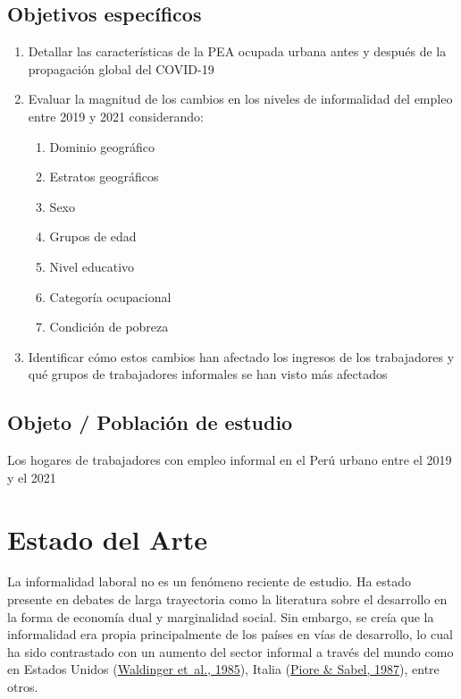 \documentclass[
  letterpaper,
  12pt,
  oneside,
  spanish,
  doublespacing,
  headsepline,
  parskip]{MastersDoctoralThesis}
\begin{document}
\hypertarget{objetivos-especuxedficos}{%
\section{Objetivos específicos}\label{objetivos-especuxedficos}}

\begin{enumerate}
\def\labelenumi{\arabic{enumi}.}
\item
  Detallar las características de la PEA ocupada urbana antes y después
  de la propagación global del COVID-19
\item
  Evaluar la magnitud de los cambios en los niveles de informalidad del
  empleo entre 2019 y 2021 considerando:

  \begin{enumerate}
  \def\labelenumii{\roman{enumii}.}
  \item
    Dominio geográfico
  \item
    Estratos geográficos
  \item
    Sexo
  \item
    Grupos de edad
  \item
    Nivel educativo
  \item
    Categoría ocupacional
  \item
    Condición de pobreza
  \end{enumerate}
\item
  Identificar cómo estos cambios han afectado los ingresos de los
  trabajadores y qué grupos de trabajadores informales se han visto más
  afectados
\end{enumerate}

\hypertarget{objeto-poblaciuxf3n-de-estudio}{%
\section{Objeto / Población de
estudio}\label{objeto-poblaciuxf3n-de-estudio}}

Los hogares de trabajadores con empleo informal en el Perú urbano entre
el 2019 y el 2021


\hypertarget{sec-estado}{%
\chapter{Estado del Arte}\label{sec-estado}}

La informalidad laboral no es un fenómeno reciente de estudio. Ha estado
presente en debates de larga trayectoria como la literatura sobre el
desarrollo en la forma de economía dual y marginalidad social. Sin
embargo, se creía que la informalidad era propia principalmente de los
países en vías de desarrollo, lo cual ha sido contrastado con un aumento
del sector informal a través del mundo como en Estados Unidos
(\protect\hyperlink{ref-waldinger1985}{Waldinger et~al., 1985}), Italia
(\protect\hyperlink{ref-piore1987}{Piore \& Sabel, 1987}), entre otros.
\end{document}
